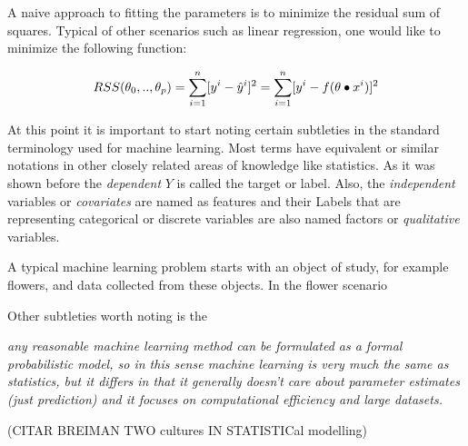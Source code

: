 A naive approach to fitting the parameters is to minimize the residual sum of squares. Typical of other scenarios such as linear regression, one would like to minimize the following function:  


\begin{equation} \label{eq:rss}
RSS(\theta_0,..,\theta_p)  = \sum_{i=1}^n [y^i - \hat{y}^i]^2  \\
=  \sum_{i=1}^n [y^i - f( \theta \bullet x^i)]^2

\end{equation}


At this point it is important to start noting certain subtleties in the standard terminology used for machine learning. Most terms have equivalent or similar notations in other closely related areas of knowledge like statistics. As it was shown before the \textit{dependent} $Y$ is called the target or label. Also, the \textit{independent} variables or \textit{covariates} are named as features and their 
Labels that are representing categorical or discrete variables are also named factors or \textit{qualitative} variables. 

A typical machine learning problem starts with an object of study, for example flowers, and data collected from these objects. In the flower scenario 

Other subtleties worth noting is the 

\textit{any reasonable machine learning method can be formulated as a formal probabilistic model, so in this sense machine learning is very much the same as statistics, but it differs in that it generally doesn't care about parameter estimates (just prediction) and it focuses on computational efficiency and large datasets.}

(CITAR BREIMAN \cite{breiman-statisticalmodeling} TWO cultures IN STATISTICal modelling)


